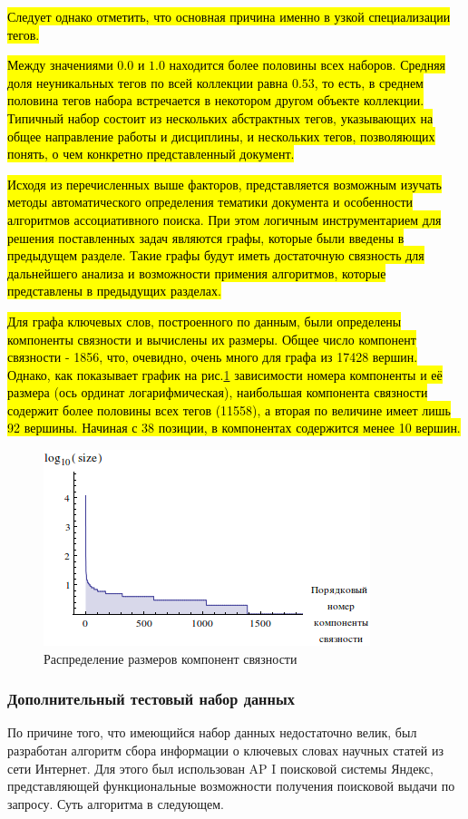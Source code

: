 \hl{Следует однако отметить, что основная причина именно в узкой специализации тегов.}

\hl{Между значениями $0.0$ и $1.0$ находится более половины всех наборов. Средняя доля неуникальных тегов по всей коллекции равна $0.53$, то есть, в среднем половина тегов набора встречается в некотором другом объекте коллекции. Типичный набор состоит из нескольких абстрактных тегов, указывающих на общее направление работы и дисциплины, и нескольких тегов, позволяющих понять, о чем конкретно представленный документ.}

\hl{Исходя из перечисленных выше факторов, представляется возможным изучать методы автоматического определения тематики документа и особенности алгоритмов ассоциативного поиска. При этом логичным инструментарием для решения поставленных задач являются графы, которые были введены в предыдущем разделе. Такие графы будут иметь достаточную связность для дальнейшего анализа и возможности примения алгоритмов, которые представлены в предыдущих разделах.}

\hl{Для графа ключевых слов, построенного по данным, были определены компоненты связности и вычислены их размеры. Общее число компонент связности - 1856, что, очевидно, очень много для графа из 17428 вершин. Однако, как показывает график на рис.\ref{img:abstr_hist_2} зависимости номера компоненты и её размера (ось ординат логарифмическая), наибольшая компонента связности содержит более половины всех тегов (11558), а вторая по величине имеет лишь 92 вершины. Начиная с 38 позиции, в компонентах содержится менее 10 вершин.}

\begin{figure}[ht]
  \begin{minipage}[ht]{1.0\linewidth}\centering
    \includegraphics[width=0.5\linewidth]{Dissertation/pics/abstr_hist_2}
    \caption{Распределение размеров компонент связности}
  \end{minipage}
  \label{img:abstr_hist_2}
\end{figure}

\subsubsection{Дополнительный тестовый набор данных}
По причине того, что имеющийся набор данных недостаточно велик, был разработан алгоритм сбора информации о ключевых словах научных статей из сети Интернет. Для этого был использован AP I поисковой системы Яндекс, представляющей функциональные возможности получения поисковой выдачи по запросу. Суть алгоритма в следующем.  

